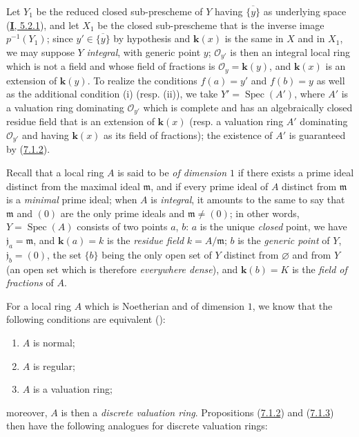 Let $Y_1$ be the reduced closed sub-prescheme of $Y$ having
$\overline{\{y\}}$ as underlying space
(\hyperref[I.5.2.1]{\textbf{I}, 5.2.1}), and let $X_1$ be the closed sub-prescheme
that is the inverse image $p^{-1}(Y_1)$; since $y'\in\overline{\{y\}}$ by
hypothesis and $\boldsymbol{k}(x)$ is the same in $X$ and in $X_1$, we may suppose $Y$
\emph{integral}, with generic point $y$; $\mathcal{O}_{y'}$ is then an
integral local ring which is not a field and whose field of fractions
is $\mathcal{O}_y=\boldsymbol{k}(y)$, and $\boldsymbol{k}(x)$ is an extension of $\boldsymbol{k}(y)$. To
realize the conditions $f(a)=y'$ and $f(b)=y$ as well as the
additional condition (i) (resp. (ii)), we take
$Y'=\operatorname{Spec}(A')$, where $A'$ is a valuation ring dominating
$\mathcal{O}_{y'}$ which is complete and has an algebraically closed residue
field that is an extension of $\boldsymbol{k}(x)$ (resp. a valuation ring $A'$
dominating $\mathcal{O}_{y'}$ and having $\boldsymbol{k}(x)$ as its field of fractions);
the existence of $A'$ is guaranteed by
(\hyperref[II.7.1.2]{7.1.2}).

\begin{env}[7.1.5]
\label{II.7.1.5}
Recall that a local ring $A$ is said to be \emph{of dimension $1$} if there
exists a prime ideal distinct from the maximal ideal $\mathfrak{m}$, and if
every prime ideal of $A$ distinct from $\mathfrak{m}$ is a \emph{minimal}
prime ideal; when $A$ is \emph{integral}, it amounts to the same to say
that $\mathfrak{m}$ and $(0)$ are the only prime ideals and
$\mathfrak{m}\neq(0)$; in other words, $Y=\operatorname{Spec}(A)$
consists of two
points $a$, $b$: $a$ is the unique \emph{closed} point, we have
$\mathfrak{j}_a=\mathfrak{m}$, and $\boldsymbol{k}(a)=k$ is the \emph{residue field}
$k=A/\mathfrak{m}$; $b$ is the \emph{generic point} of $Y$,
$\mathfrak{j}_b=(0)$, the set $\{b\}$ being the only open set of
$Y$ distinct from $\varnothing$ and from $Y$ (an open set which is therefore
\emph{everywhere dense}), and $\boldsymbol{k}(b)=K$ is the \emph{field of fractions} of $A$.
\end{env}

\begin{env}[7.1.6]
\label{II.7.1.6}
For a local ring $A$ which is Noetherian and of dimension $1$, we know that
the following conditions are equivalent
(\cite[p.~2-08 and 17-01]{I-1}):
\begin{enumerate}
\item[\rm{a)}] $A$ is normal;
\item[\rm{b)}] $A$ is regular;
\item[\rm{c)}] $A$ is a valuation ring;
\end{enumerate}
moreover, $A$ is then a \emph{discrete valuation ring}. Propositions
(\hyperref[II.7.1.2]{7.1.2}) and
(\hyperref[II.7.1.3]{7.1.3}) then have the following analogues for
discrete valuation rings:
\end{env}


